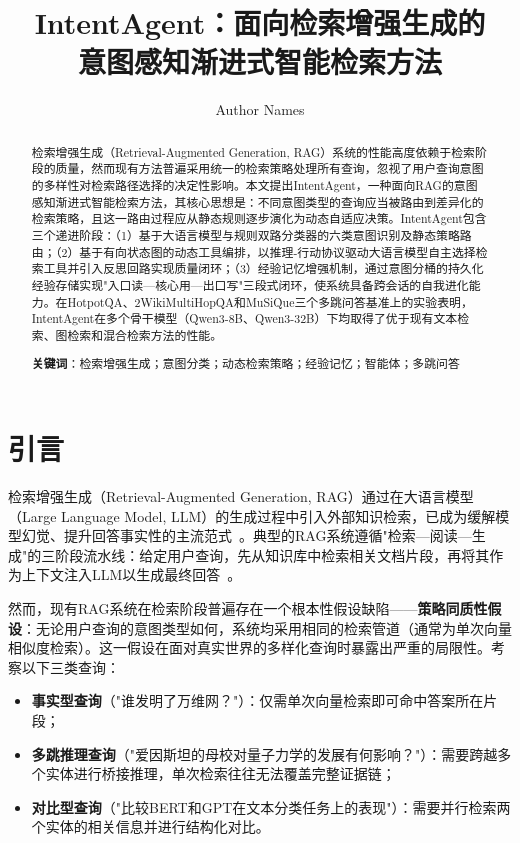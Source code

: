 \documentclass[runningheads]{llncs}
\begin{document}
\title{IntentAgent：面向检索增强生成的\\意图感知渐进式智能检索方法}

\author{Author Names}

\maketitle

\begin{abstract}
检索增强生成（Retrieval-Augmented Generation, RAG）系统的性能高度依赖于检索阶段的质量，然而现有方法普遍采用统一的检索策略处理所有查询，忽视了用户查询意图的多样性对检索路径选择的决定性影响。本文提出IntentAgent，一种面向RAG的意图感知渐进式智能检索方法，其核心思想是：不同意图类型的查询应当被路由到差异化的检索策略，且这一路由过程应从静态规则逐步演化为动态自适应决策。IntentAgent包含三个递进阶段：（1）基于大语言模型与规则双路分类器的六类意图识别及静态策略路由；（2）基于有向状态图的动态工具编排，以推理-行动协议驱动大语言模型自主选择检索工具并引入反思回路实现质量闭环；（3）经验记忆增强机制，通过意图分桶的持久化经验存储实现"入口读—核心用—出口写"三段式闭环，使系统具备跨会话的自我进化能力。在HotpotQA、2WikiMultiHopQA和MuSiQue三个多跳问答基准上的实验表明，IntentAgent在多个骨干模型（Qwen3-8B、Qwen3-32B）下均取得了优于现有文本检索、图检索和混合检索方法的性能。

\textbf{关键词}：检索增强生成；意图分类；动态检索策略；经验记忆；智能体；多跳问答
\end{abstract}

\section{引言}

检索增强生成（Retrieval-Augmented Generation, RAG）通过在大语言模型（Large Language Model, LLM）的生成过程中引入外部知识检索，已成为缓解模型幻觉、提升回答事实性的主流范式~\cite{ref1}。典型的RAG系统遵循"检索—阅读—生成"的三阶段流水线：给定用户查询，先从知识库中检索相关文档片段，再将其作为上下文注入LLM以生成最终回答~\cite{ref2}。

然而，现有RAG系统在检索阶段普遍存在一个根本性假设缺陷——\textbf{策略同质性假设}：无论用户查询的意图类型如何，系统均采用相同的检索管道（通常为单次向量相似度检索）。这一假设在面对真实世界的多样化查询时暴露出严重的局限性。考察以下三类查询：

\begin{itemize}[leftmargin=*]
    \item \textbf{事实型查询}（"谁发明了万维网？"）：仅需单次向量检索即可命中答案所在片段；
    \item \textbf{多跳推理查询}（"爱因斯坦的母校对量子力学的发展有何影响？"）：需要跨越多个实体进行桥接推理，单次检索往往无法覆盖完整证据链；
    \item \textbf{对比型查询}（"比较BERT和GPT在文本分类任务上的表现"）：需要并行检索两个实体的相关信息并进行结构化对比。
\end{itemize}
\end{document}
